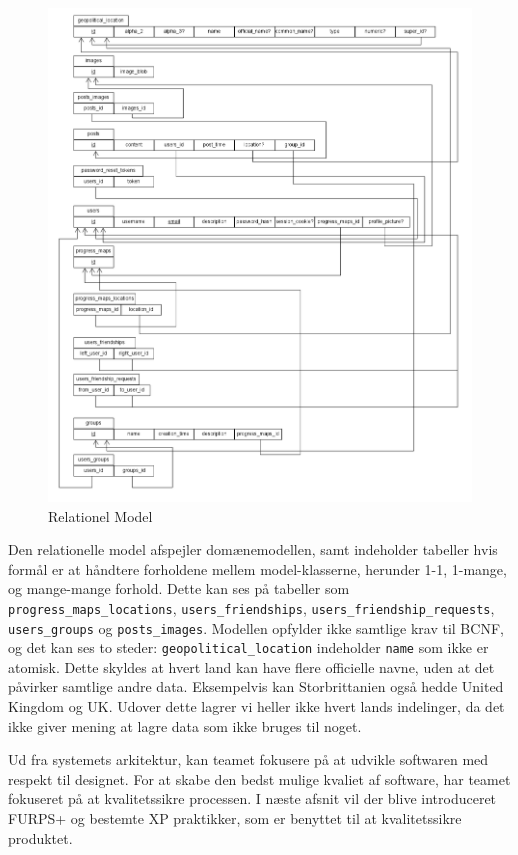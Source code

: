 \begin{figure}
    \includegraphics[width=\linewidth]{figures/RelationelmModel.png}
    \caption{Relationel Model}
    \label{fif:Rela}
\end{figure}

Den relationelle model afspejler domænemodellen, samt indeholder tabeller hvis formål er at håndtere forholdene mellem model-klasserne, herunder 1-1, 1-mange, og mange-mange forhold. Dette kan ses på tabeller som \texttt{progress\_maps\_locations}, \texttt{users\_friendships}, \texttt{users\_friendship\_requests}, \texttt{users\_groups} og \texttt{posts\_images}. Modellen opfylder ikke samtlige krav til BCNF\cite{bcnf}, og det kan ses to steder: \texttt{geopolitical\_location} indeholder \texttt{name} som ikke er atomisk. Dette skyldes at hvert land kan have flere officielle navne, uden at det påvirker samtlige andre data. Eksempelvis kan Storbrittanien også hedde United Kingdom og UK. Udover dette lagrer vi heller ikke hvert lands indelinger, da det ikke giver mening at lagre data som ikke bruges til noget. 

Ud fra systemets arkitektur, kan teamet fokusere på at udvikle softwaren med respekt til designet. For at skabe den bedst mulige kvaliet af software, har teamet fokuseret på at kvalitetssikre processen. I næste afsnit vil der blive introduceret FURPS+ og bestemte XP praktikker, som er benyttet til at kvalitetssikre produktet.  
